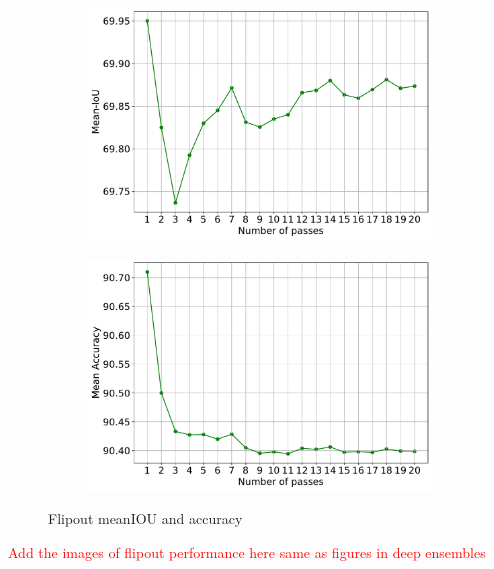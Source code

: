     \begin{figure}[h!]
        \begin{subfigure}{0.495\textwidth}
            \includegraphics[scale=0.35]{images/flipout_meanIOU.pdf}
            \caption{}
            \label{fig:meaniou_flipout}
        \end{subfigure}
        \begin{subfigure}{0.495\textwidth}
            \includegraphics[scale=0.35]{images/flipout_accuracy.pdf}
            \caption{}
            \label{fig:accuracy_flipout}
        \end{subfigure}
        \caption{Flipout meanIOU and accuracy}
    \end{figure}
    
    \textcolor{red}{Add the images of flipout performance here same as figures in deep ensembles}

